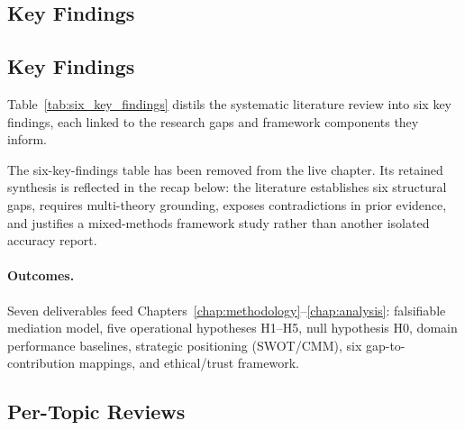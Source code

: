 \subsection{Key Findings}

\subsection{Key Findings}

\noindent Table~\ref{tab:six_key_findings} distils the systematic literature review into six key findings, each linked to the research gaps and framework components they inform.

\noindent The six-key-findings table has been removed from the live chapter. Its retained synthesis is reflected in the recap below: the literature establishes six structural gaps, requires multi-theory grounding, exposes contradictions in prior evidence, and justifies a mixed-methods framework study rather than another isolated accuracy report.

\paragraph{Outcomes.}
Seven deliverables feed Chapters~\ref{chap:methodology}--\ref{chap:analysis}: falsifiable mediation model, five operational hypotheses H1--H5, null hypothesis H0, domain performance baselines, strategic positioning (SWOT/CMM), six gap-to-contribution mappings, and ethical/trust framework.




\subsection{Per-Topic Reviews}

